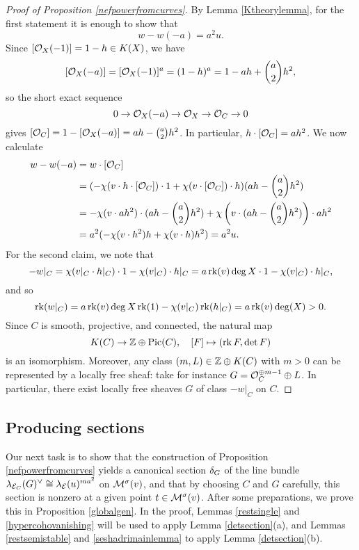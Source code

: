 \documentclass[letterpaper,11pt]{amsart}%
\theoremstyle{remark}
\begin{document}
\begin{proof}[Proof of Proposition \ref{nefpowerfromcurves}]
    By Lemma \ref{Ktheorylemma}, for the first statement it is enough to show that
    \[ w - w(-a) = a^2 u. \]
    Since $[\mathcal{O}_X(-1)] = 1 - h \in K(X)$, we have
    \[ [\mathcal{O}_X(-a)] = [\mathcal{O}_X(-1)]^a = (1 - h)^a = 1 - a h + \binom{a}{2} h^2, \]
    so the short exact sequence
    \[ 0 \to \mathcal{O}_X(-a) \to \mathcal{O}_X \to \mathcal{O}_C \to 0 \]
    gives $[\mathcal{O}_C] = 1 - [\mathcal{O}_X(-a)] = a h - \binom{a}{2} h^2$. In particular, $h \cdot [\mathcal{O}_C] = a h^2$. We now calculate
    \begin{align*}
        w - w(-a) & = w \cdot [\mathcal{O}_C] \\
        & = (-\chi(v \cdot h \cdot [\mathcal{O}_C]) \cdot 1 + \chi(v \cdot [\mathcal{O}_C]) \cdot h) (a h - \binom{a}{2} h^2) \\
        & = - \chi(v \cdot ah^2) \cdot (a h - \binom{a}{2} h^2) + \chi\left(v \cdot (a h - \binom{a}{2} h^2)\right) \cdot a h^2 \\
        & = a^2 ( - \chi(v \cdot h^2) h + \chi(v \cdot h) h^2) = a^2 u.
    \end{align*}
    For the second claim, we note that 
    \[ -w|_C = \chi(v|_C \cdot h|_C) \cdot 1 - \chi(v|_C) \cdot h|_C = a \operatorname{\mathrm{rk}}(v) \deg X \cdot 1 - \chi(v|_C) \cdot h|_C, \]
    and so 
    \[ \operatorname{\mathrm{rk}}(w|_C) = a \operatorname{\mathrm{rk}}(v) \deg X \operatorname{\mathrm{rk}}(1) - \chi(v|_C) \operatorname{\mathrm{rk}}(h|_C) = a \operatorname{\mathrm{rk}}(v) \deg(X) > 0. \] 
    Since $C$ is smooth, projective, and connected, the natural map 
    \[ K(C) \to \mathbb{Z} \oplus \mathrm{Pic}(C), \quad [F] \mapsto (\operatorname{\mathrm{rk}} F, \det F) \] 
    is an isomorphism. Moreover, any class $(m, L) \in \mathbb{Z} \oplus K(C)$ with $m > 0$ can be represented by a locally free sheaf: take for instance $G = \mathcal{O}_C^{\oplus m-1} \oplus L$. In particular, there exist locally free sheaves $G$ of class $- w|_C$ on $C$.
\end{proof}

\subsection{Producing sections}
Our next task is to show that the construction of Proposition \ref{nefpowerfromcurves} yields a canonical section $\delta_G$ of the line bundle $\lambda_{\mathcal{E}_C}(G)^\vee \cong \lambda_{\mathcal{E}}(u)^{m a^2}$ on $\mathcal{M}^\sigma(v)$, and that by choosing $C$ and $G$ carefully, this section is nonzero at a given point $t \in \mathcal{M}^\sigma(v)$. After some preparations, we prove this in Proposition \ref{globalgen}. In the proof, Lemmas \ref{restsingle} and \ref{hypercohovanishing} will be used to apply Lemma \ref{detsection}(a), and Lemmas \ref{restsemistable} and \ref{seshadrimainlemma} to apply Lemma \ref{detsection}(b).
\end{document}
